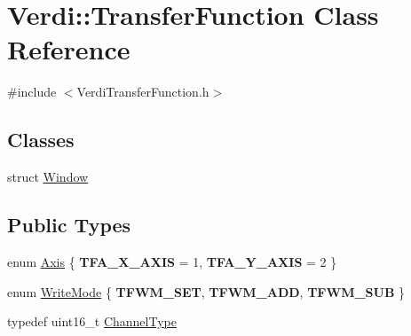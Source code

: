 \hypertarget{class_verdi_1_1_transfer_function}{\section{\-Verdi\-:\-:\-Transfer\-Function \-Class \-Reference}
\label{class_verdi_1_1_transfer_function}
}


{\ttfamily \#include $<$\-Verdi\-Transfer\-Function.\-h$>$}

\subsection*{\-Classes}
\begin{DoxyCompactItemize}
\item 
struct \hyperlink{struct_verdi_1_1_transfer_function_1_1_window}{\-Window}
\end{DoxyCompactItemize}
\subsection*{\-Public \-Types}
\begin{DoxyCompactItemize}
\item 
enum \hyperlink{class_verdi_1_1_transfer_function_a1b35c3ddc3f16d44146168cdad8cdd6a}{\-Axis} \{ {\bfseries \-T\-F\-A\-\_\-\-X\-\_\-\-A\-X\-I\-S} =  1, 
{\bfseries \-T\-F\-A\-\_\-\-Y\-\_\-\-A\-X\-I\-S} =  2
 \}
\item 
enum \hyperlink{class_verdi_1_1_transfer_function_ab597e576b24962e48164808518c06714}{\-Write\-Mode} \{ {\bfseries \-T\-F\-W\-M\-\_\-\-S\-E\-T}, 
{\bfseries \-T\-F\-W\-M\-\_\-\-A\-D\-D}, 
{\bfseries \-T\-F\-W\-M\-\_\-\-S\-U\-B}
 \}
\item 
typedef uint16\-\_\-t \hyperlink{class_verdi_1_1_transfer_function_aebdbb5a13f273ee6d47d1a4dde6d6aa6}{\-Channel\-Type}
\end{DoxyCompactItemize}
